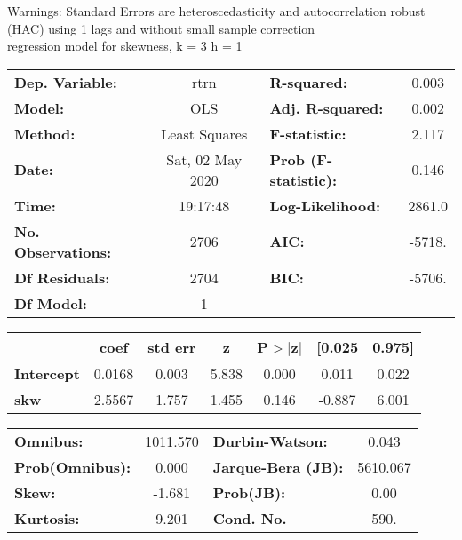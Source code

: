 Warnings: \newline
 [1] Standard Errors are heteroscedasticity and autocorrelation robust (HAC) using 1 lags and without small sample correction\\ 

regression model for skewness, k = 3 h = 1\begin{center}
\begin{tabular}{lclc}
\toprule
\textbf{Dep. Variable:}    &       rtrn       & \textbf{  R-squared:         } &     0.003   \\
\textbf{Model:}            &       OLS        & \textbf{  Adj. R-squared:    } &     0.002   \\
\textbf{Method:}           &  Least Squares   & \textbf{  F-statistic:       } &     2.117   \\
\textbf{Date:}             & Sat, 02 May 2020 & \textbf{  Prob (F-statistic):} &    0.146    \\
\textbf{Time:}             &     19:17:48     & \textbf{  Log-Likelihood:    } &    2861.0   \\
\textbf{No. Observations:} &        2706      & \textbf{  AIC:               } &    -5718.   \\
\textbf{Df Residuals:}     &        2704      & \textbf{  BIC:               } &    -5706.   \\
\textbf{Df Model:}         &           1      & \textbf{                     } &             \\
\bottomrule
\end{tabular}
\begin{tabular}{lcccccc}
                   & \textbf{coef} & \textbf{std err} & \textbf{z} & \textbf{P$> |$z$|$} & \textbf{[0.025} & \textbf{0.975]}  \\
\midrule
\textbf{Intercept} &       0.0168  &        0.003     &     5.838  &         0.000        &        0.011    &        0.022     \\
\textbf{skw}       &       2.5567  &        1.757     &     1.455  &         0.146        &       -0.887    &        6.001     \\
\bottomrule
\end{tabular}
\begin{tabular}{lclc}
\textbf{Omnibus:}       & 1011.570 & \textbf{  Durbin-Watson:     } &    0.043  \\
\textbf{Prob(Omnibus):} &   0.000  & \textbf{  Jarque-Bera (JB):  } & 5610.067  \\
\textbf{Skew:}          &  -1.681  & \textbf{  Prob(JB):          } &     0.00  \\
\textbf{Kurtosis:}      &   9.201  & \textbf{  Cond. No.          } &     590.  \\
\bottomrule
\end{tabular}
\end{center}

